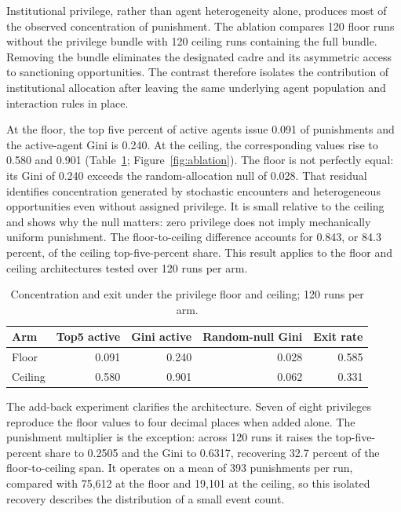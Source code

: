 \documentclass[12pt]{article}
\begin{document}
Institutional privilege, rather than agent heterogeneity alone, produces most of the observed
concentration of punishment. The ablation compares 120 floor runs without the privilege bundle
with 120 ceiling runs containing the full bundle. Removing the bundle eliminates the designated
cadre and its asymmetric access to sanctioning opportunities. The contrast therefore isolates
the contribution of institutional allocation after leaving the same underlying agent population
and interaction rules in place.

At the floor, the top five percent of active agents issue 0.091 of punishments and the
active-agent Gini is 0.240. At the ceiling, the corresponding values rise to 0.580 and 0.901
(Table~\ref{tab:privilege-ablation}; Figure~\ref{fig:ablation}). The floor is not perfectly
equal: its Gini of 0.240 exceeds the random-allocation null of 0.028. That residual identifies
concentration generated by stochastic encounters and heterogeneous opportunities even without
assigned privilege. It is small relative to the ceiling and shows why the null matters: zero
privilege does not imply mechanically uniform punishment. The floor-to-ceiling difference
accounts for 0.843, or 84.3 percent, of the ceiling top-five-percent share. This result applies
to the floor and ceiling architectures tested over 120 runs per arm.

\begin{table}[htbp]
\centering
\caption{Concentration and exit under the privilege floor and ceiling; 120 runs per arm.}
\label{tab:privilege-ablation}
\begin{tabular}{lrrrr}
\hline
Arm & Top5 active & Gini active & Random-null Gini & Exit rate \\
\hline
Floor & 0.091 & 0.240 & 0.028 & 0.585 \\
Ceiling & 0.580 & 0.901 & 0.062 & 0.331 \\
\hline
\end{tabular}
\end{table}

The add-back experiment clarifies the architecture. Seven of eight privileges reproduce the
floor values to four decimal places when added alone. The punishment multiplier is the
exception: across 120 runs it raises the top-five-percent share to 0.2505 and the Gini to
0.6317, recovering 32.7 percent of the floor-to-ceiling span. It operates on a mean of 393
punishments per run, compared with 75,612 at the floor and 19,101 at the ceiling, so this
isolated recovery describes the distribution of a small event count.
\end{document}
